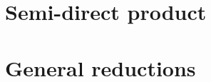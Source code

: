 \documentclass[10pt]{report}
\newcommand{\NN}{\mathbb{N}}
\newcommand{\BB}{\mathbb{B}}
\begin{document}
\section{Semi-direct product}

\section{General reductions}






%
% 


\end{document}
